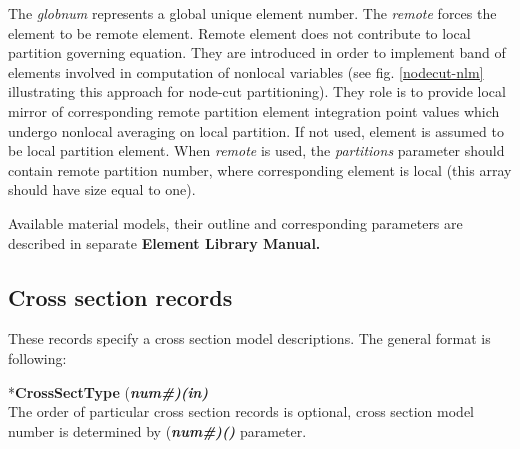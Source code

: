\documentclass[draft]{article}
\newcommand{\param}[1]{{\em #1}}
\newcommand{\fieldVal}[2]{\mbox{({\it\bf{#1}\#)\tiny (#2)}}}
\newcommand{\entKeyword}[1]{\mbox{{*{\bf{#1}}}}}
\newcommand{\Pmode}[1]{{\sffamily #1}}
\begin{document}
\Pmode{
The \param{globnum} represents a global unique element number.
The \param{remote} forces the element to be remote element. Remote
element does not contribute to local partition governing equation.
They are introduced in order to implement band of elements involved
in computation of nonlocal variables (see fig. \ref{nodecut-nlm} illustrating
this approach for node-cut partitioning). They role is to provide
local mirror of corresponding remote partition element integration point values which undergo
nonlocal averaging on local partition. 
If not used, element is assumed to be local partition element.
When \param{remote} is used, the \param{partitions} parameter should 
contain remote partition number, where
corresponding element is local (this array should have size equal to one).
}


Available material models, their outline and
corresponding parameters are described in separate {\bf Element Library Manual.}

\subsection{Cross section records}
\label{_CrossSectionRecords}
These records specify a cross section model descriptions. The general format is
following:

\entKeyword{CrossSectType} \fieldVal{num}{in} \\

The order of particular cross section records is optional, cross section 
model number is determined by \fieldVal{num}{} parameter.
\end{document}
